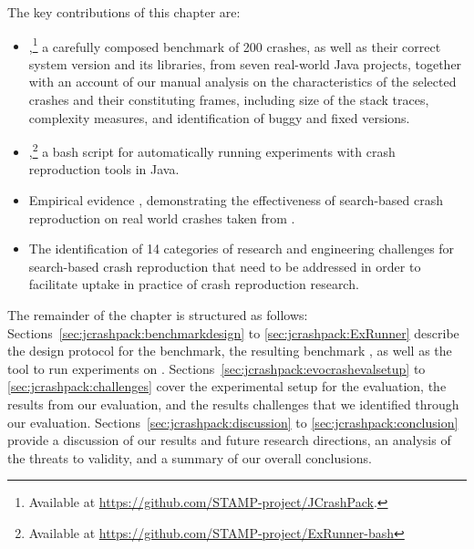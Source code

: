 The key contributions of this chapter are:
\begin{itemize}
\item \crashpack,\footnote{Available at \url{https://github.com/STAMP-project/JCrashPack}.} a carefully composed benchmark of 200 crashes, as well as their correct system version and its libraries, from seven real-world Java projects, together with an account of our manual analysis on the characteristics of the selected crashes and their constituting frames, including size of the stack traces, complexity measures, and identification of buggy and fixed versions.

\item \exrunner,\footnote{Available at \url{https://github.com/STAMP-project/ExRunner-bash}} a bash script for automatically running experiments with crash reproduction tools in Java.

\item Empirical evidence \cite{zenodoJCrashPack}, demonstrating the effectiveness of search-based crash reproduction on real world crashes taken from \crashpack.

\item The identification of 14 categories of research and engineering challenges for search-based crash reproduction that need to be addressed in order to facilitate uptake in practice of crash reproduction research.

\end{itemize}

The remainder of the chapter is structured as follows:
Sections~\ref{sec:jcrashpack:benchmarkdesign} to \ref{sec:jcrashpack:ExRunner} describe the design protocol for the benchmark, the resulting benchmark \crashpack, as well as the \exrunner tool to run experiments on \crashpack.
Sections~\ref{sec:jcrashpack:evocrashevalsetup} to \ref{sec:jcrashpack:challenges} cover the experimental setup for the \evocrash evaluation, the results from our evaluation, and the results challenges that we identified through our evaluation.
Sections~\ref{sec:jcrashpack:discussion} to \ref{sec:jcrashpack:conclusion} provide a discussion of our results and future research directions, an analysis of the threats to validity, and a summary of our overall conclusions.


